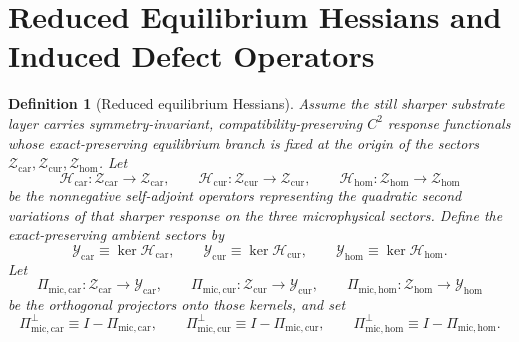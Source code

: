 \documentclass[11pt]{article}
\newcommand{\ProtoTensorClass}{\mathscr Y_{\mathrm{car}}}
\newcommand{\ProtoRelabelClass}{\mathscr Y_{\mathrm{cur}}}
\newcommand{\ProtoFreeClass}{\mathscr Y_{\mathrm{hom}}}
\newcommand{\UltraTensorClass}{\mathscr Z_{\mathrm{car}}}
\newcommand{\UltraRelabelClass}{\mathscr Z_{\mathrm{cur}}}
\newcommand{\UltraFreeClass}{\mathscr Z_{\mathrm{hom}}}
\newcommand{\UltraCarProj}{\Pi_{\mathrm{mic,car}}}
\newcommand{\UltraCurProj}{\Pi_{\mathrm{mic,cur}}}
\newcommand{\UltraHomProj}{\Pi_{\mathrm{mic,hom}}}
\newcommand{\UltraCarPerp}{\Pi_{\mathrm{mic,car}}^{\perp}}
\newcommand{\UltraCurPerp}{\Pi_{\mathrm{mic,cur}}^{\perp}}
\newcommand{\UltraHomPerp}{\Pi_{\mathrm{mic,hom}}^{\perp}}
\newcommand{\TensorHess}{\mathcal H_{\mathrm{car}}}
\newcommand{\CurHess}{\mathcal H_{\mathrm{cur}}}
\newcommand{\HomHess}{\mathcal H_{\mathrm{hom}}}
\newtheorem{definition}{Definition}
\begin{document}
\section{Reduced Equilibrium Hessians and Induced Defect Operators}

\begin{definition}[Reduced equilibrium Hessians]
\label{def:hessians}
Assume the still sharper substrate layer carries symmetry-invariant, compatibility-preserving \(C^2\) response functionals whose exact-preserving equilibrium branch is fixed at the origin of the sectors \(\UltraTensorClass,\UltraRelabelClass,\UltraFreeClass\). Let
\begin{equation}
\TensorHess:\UltraTensorClass\to\UltraTensorClass,
\qquad
\CurHess:\UltraRelabelClass\to\UltraRelabelClass,
\qquad
\HomHess:\UltraFreeClass\to\UltraFreeClass
\label{eq:hess}
\end{equation}
be the nonnegative self-adjoint operators representing the quadratic second variations of that sharper response on the three microphysical sectors. Define the exact-preserving ambient sectors by
\begin{equation}
\ProtoTensorClass\equiv \ker\TensorHess,
\qquad
\ProtoRelabelClass\equiv \ker\CurHess,
\qquad
\ProtoFreeClass\equiv \ker\HomHess.
\label{eq:hess_kernels}
\end{equation}
Let
\begin{equation}
\UltraCarProj:\UltraTensorClass\to\ProtoTensorClass,
\qquad
\UltraCurProj:\UltraRelabelClass\to\ProtoRelabelClass,
\qquad
\UltraHomProj:\UltraFreeClass\to\ProtoFreeClass
\label{eq:hess_proj}
\end{equation}
be the orthogonal projectors onto those kernels, and set
\begin{equation}
\UltraCarPerp\equiv I-\UltraCarProj,
\qquad
\UltraCurPerp\equiv I-\UltraCurProj,
\qquad
\UltraHomPerp\equiv I-\UltraHomProj.
\label{eq:hess_perp}
\end{equation}
\end{definition}
\end{document}
